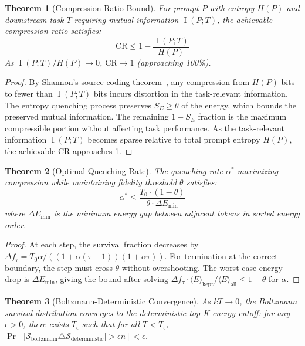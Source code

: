 \documentclass[11pt]{article}
\newtheorem{theorem}{Theorem}[section]
\theoremstyle{remark}
\DeclareMathOperator{\MI}{I}
\begin{document}
\begin{theorem}[Compression Ratio Bound]
\label{thm:compression-bound}
For prompt $P$ with entropy $H(P)$ and downstream task $T$ requiring mutual
information $\MI(P; T)$, the achievable compression ratio satisfies:
\begin{equation}
    \text{CR} \leq 1 - \frac{\MI(P; T)}{H(P)}
\end{equation}
As $\MI(P; T)/H(P) \to 0$, $\text{CR} \to 1$ (approaching 100\%).
\end{theorem}

\begin{proof}
By Shannon's source coding theorem~\cite{shannon1948}, any compression from
$H(P)$ bits to fewer than $\MI(P; T)$ bits incurs distortion in the
task-relevant information. The entropy quenching process preserves
$S_E \geq \theta$ of the energy, which bounds the preserved mutual
information. The remaining $1 - S_E$ fraction is the maximum compressible
portion without affecting task performance. As the task-relevant information
$\MI(P; T)$ becomes sparse relative to total prompt entropy $H(P)$, the
achievable CR approaches 1.
\end{proof}

\begin{theorem}[Optimal Quenching Rate]
\label{thm:optimal-alpha}
The quenching rate $\alpha^*$ maximizing compression while maintaining
fidelity threshold $\theta$ satisfies:
\begin{equation}
    \alpha^* \leq \frac{T_0 \cdot (1 - \theta)}{\theta \cdot \Delta E_{\min}}
\end{equation}
where $\Delta E_{\min}$ is the minimum energy gap between adjacent tokens
in sorted energy order.
\end{theorem}

\begin{proof}
At each step, the survival fraction decreases by
$\Delta f_\tau = T_0\alpha / ((1 + \alpha(\tau-1))(1 + \alpha\tau))$.
For termination at the correct boundary, the step must cross $\theta$ without
overshooting. The worst-case energy drop is $\Delta E_{\min}$, giving the
bound after solving $\Delta f_\tau \cdot \langle E \rangle_{\text{kept}}
/ \langle E \rangle_{\text{all}} \leq 1 - \theta$ for $\alpha$.
\end{proof}

\begin{theorem}[Boltzmann-Deterministic Convergence]
\label{thm:boltzmann-convergence}
As $kT \to 0$, the Boltzmann survival distribution converges to the
deterministic top-K energy cutoff: for any $\epsilon > 0$, there exists
$T_\epsilon$ such that for all $T < T_\epsilon$,
$\Pr[|\mathcal{S}_{\text{boltzmann}} \triangle \mathcal{S}_{\text{deterministic}}|
> \epsilon n] < \epsilon$.
\end{theorem}
\end{document}
